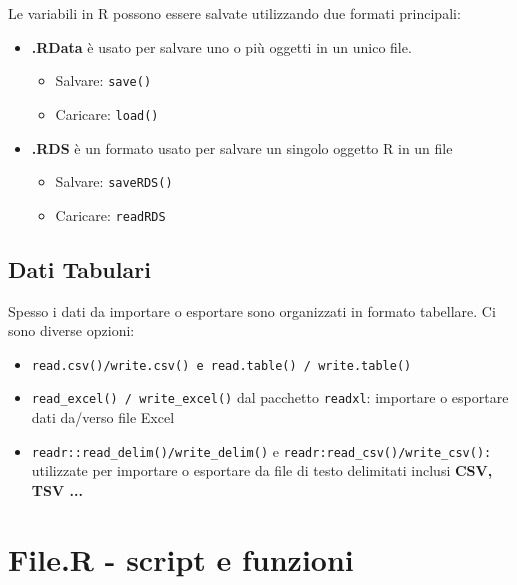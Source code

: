 Le variabili in R possono essere salvate utilizzando due formati principali: 
\begin{itemize}
  \item \textbf{.RData} è usato per salvare uno o più oggetti in un unico file. \begin{itemize}
    \item Salvare: \texttt{save()}
    \item Caricare: \texttt{load()}
  \end{itemize}
  \item \textbf{.RDS} è un formato usato per salvare un singolo oggetto R in un file
  \begin{itemize}
    \item Salvare: \texttt{saveRDS()}
    \item Caricare: \texttt{readRDS}
  \end{itemize}
\end{itemize}


\subsection{Dati Tabulari}
Spesso i dati da importare o esportare sono organizzati in formato tabellare.
Ci sono diverse opzioni:

\begin{itemize}
  \item \texttt{read.csv()/write.csv() e read.table() / write.table()}
  \item \texttt{read\_excel() / write\_excel()} dal pacchetto \texttt{readxl}: importare o esportare dati da/verso file Excel
  \item \texttt{readr::read\_delim()/write\_delim()} e \texttt{readr:read\_csv()/write\_csv():} utilizzate per importare o esportare da file di testo delimitati inclusi \textbf{CSV, TSV ...}
\end{itemize}



\section{File.R - script e funzioni}

